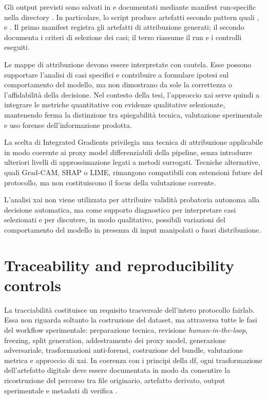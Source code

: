 Gli output previsti sono salvati in
 e documentati mediante
manifest run-specific nella directory .
In particolare, lo script produce artefatti secondo pattern quali
,
 e
. Il primo manifest
registra gli artefatti di attribuzione generati; il secondo documenta i criteri
di selezione dei casi; il terzo riassume il run e i controlli eseguiti.

Le mappe di attribuzione devono essere interpretate con cautela. Esse possono
supportare l'analisi di casi specifici e contribuire a formulare ipotesi sul
comportamento del modello, ma non dimostrano da sole la correttezza o
l'affidabilità della decisione. Nel contesto della tesi, l'approccio \gls{xai}
serve quindi a integrare le metriche quantitative con evidenze qualitative
selezionate, mantenendo ferma la distinzione tra spiegabilità tecnica,
valutazione sperimentale e uso forense dell'informazione prodotta.

La scelta di Integrated Gradients privilegia una tecnica di attribuzione
applicabile in modo coerente ai proxy model differenziabili della pipeline,
senza introdurre ulteriori livelli di approssimazione legati a metodi
surrogati. Tecniche alternative, quali Grad-CAM, SHAP o LIME, rimangono
compatibili con estensioni future del protocollo, ma non costituiscono il focus
della valutazione corrente.

L'analisi \gls{xai} non viene utilizzata per attribuire validità probatoria
autonoma alla decisione automatica, ma come supporto diagnostico per interpretare
casi selezionati e per discutere, in modo qualitativo, possibili variazioni del
comportamento del modello in presenza di input manipolati o fuori distribuzione.

\section{Traceability and reproducibility controls}
\label{sec:methodology-traceability-controls}

La tracciabilità costituisce un requisito trasversale dell'intero protocollo
\gls{fairlab}. Essa non riguarda soltanto la costruzione del dataset, ma
attraversa tutte le fasi del workflow sperimentale: preparazione tecnica, revisione
\textit{human-in-the-loop}, freezing, split generation, addestramento dei proxy
model, generazione adversariale, trasformazioni anti-forensi, costruzione del
bundle, valutazione metrica e approccio di \gls{xai}. In coerenza con i principi della
\gls{df}, ogni trasformazione dell'artefatto digitale deve essere documentata in
modo da consentire la ricostruzione del percorso tra file originario, artefatto
derivato, output sperimentale e metadati di verifica \cite{casey2011digital,nist2006guide,iso27037}.

